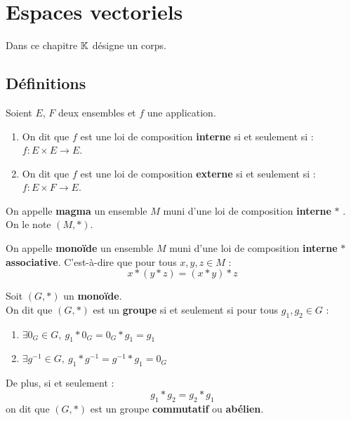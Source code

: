 \chapter{Espaces vectoriels}\label{chap:espaces_vectoriels}
\def\arraystretch{1}

\par \noindent Dans ce chapitre $\mathbb{K}$ désigne un corps.

\section{Définitions}
\begin{definition}
	Soient $E$, $F$ deux ensembles et $f$ une application.
	\begin{enumerate}
		\item On dit que $f$ est une loi de composition \textbf{interne} si et seulement si : $f : E \times E \to E$.
		\item On dit que $f$ est une loi de composition \textbf{externe} si et seulement si : $f : E \times F \to E$.
	\end{enumerate}
\end{definition}

\begin{definition}[Magma]
	On appelle \textbf{magma} un ensemble $M$ muni d'une loi de composition \textbf{interne} \og $*$ \fg. 
	\\
	On le note $(M, *)$.
\end{definition}

\begin{definition}
	On appelle \textbf{monoïde} un ensemble $M$ muni d'une loi de composition \textbf{interne} \og $*$ \fg \textbf{associative}. C'est-à-dire que pour tous $x, y, z \in M$ :
	\[ x * (y * z) = (x * y) * z \]
\end{definition}

\begin{definition}[Groupe]
	Soit $(G, *)$ un \textbf{monoïde}.
	\\ 
	On dit que $(G, *)$ est un \textbf{groupe} si et seulement si pour tous $g_1, g_2 \in G$ : 
    \begin{enumerate}
    		\item $\exists 0_G \in G,\ g_1 * 0_G = 0_G * g_1 = g_1$
    		\item $\exists g^{-1} \in G,\ g_1 * g^{-1} = g^{-1} * g_1 = 0_G$
    	\end{enumerate}
    \noindent De plus, si et seulement :
    \[ g_1 * g_2 = g_2 * g_1 \]
    on dit que $(G, *)$ est un groupe \textbf{commutatif} ou \textbf{abélien}.
\end{definition}

